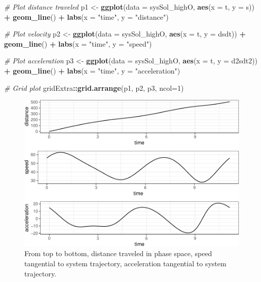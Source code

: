 \documentclass[12pt,twoside,openany]{reedthesis}
\newenvironment{Shaded}{\begin{snugshade}}{\end{snugshade}}
\newcommand{\KeywordTok}[1]{\textcolor[rgb]{0.13,0.29,0.53}{\textbf{#1}}}
\newcommand{\DataTypeTok}[1]{\textcolor[rgb]{0.13,0.29,0.53}{#1}}
\newcommand{\DecValTok}[1]{\textcolor[rgb]{0.00,0.00,0.81}{#1}}
\newcommand{\StringTok}[1]{\textcolor[rgb]{0.31,0.60,0.02}{#1}}
\newcommand{\CommentTok}[1]{\textcolor[rgb]{0.56,0.35,0.01}{\textit{#1}}}
\newcommand{\OperatorTok}[1]{\textcolor[rgb]{0.81,0.36,0.00}{\textbf{#1}}}
\newcommand{\NormalTok}[1]{#1}
\begin{document}
\begin{Shaded}
\begin{Highlighting}[]
\CommentTok{# Plot distance traveled}
\NormalTok{p1 <-}\StringTok{ }\KeywordTok{ggplot}\NormalTok{(}\DataTypeTok{data =}\NormalTok{ sysSol_highO, }\KeywordTok{aes}\NormalTok{(}\DataTypeTok{x =}\NormalTok{ t, }\DataTypeTok{y =}\NormalTok{ s)) }\OperatorTok{+}
\StringTok{  }\KeywordTok{geom_line}\NormalTok{() }\OperatorTok{+}
\StringTok{  }\KeywordTok{labs}\NormalTok{(}\DataTypeTok{x =} \StringTok{"time"}\NormalTok{, }\DataTypeTok{y =} \StringTok{"distance"}\NormalTok{)}

\CommentTok{# Plot velocity}
\NormalTok{p2 <-}\StringTok{ }\KeywordTok{ggplot}\NormalTok{(}\DataTypeTok{data =}\NormalTok{ sysSol_highO, }\KeywordTok{aes}\NormalTok{(}\DataTypeTok{x =}\NormalTok{ t, }\DataTypeTok{y =}\NormalTok{ dsdt)) }\OperatorTok{+}
\StringTok{  }\KeywordTok{geom_line}\NormalTok{() }\OperatorTok{+}
\StringTok{  }\KeywordTok{labs}\NormalTok{(}\DataTypeTok{x =} \StringTok{"time"}\NormalTok{, }\DataTypeTok{y =} \StringTok{"speed"}\NormalTok{)}

\CommentTok{# Plot acceleration}
\NormalTok{p3 <-}\StringTok{ }\KeywordTok{ggplot}\NormalTok{(}\DataTypeTok{data =}\NormalTok{ sysSol_highO, }\KeywordTok{aes}\NormalTok{(}\DataTypeTok{x =}\NormalTok{ t, }\DataTypeTok{y =}\NormalTok{ d2sdt2)) }\OperatorTok{+}
\StringTok{  }\KeywordTok{geom_line}\NormalTok{() }\OperatorTok{+}
\StringTok{  }\KeywordTok{labs}\NormalTok{(}\DataTypeTok{x =} \StringTok{"time"}\NormalTok{, }\DataTypeTok{y =} \StringTok{"acceleration"}\NormalTok{)}

\CommentTok{# Grid plot}
\NormalTok{gridExtra}\OperatorTok{::}\KeywordTok{grid.arrange}\NormalTok{(p1, p2, p3, }\DataTypeTok{ncol=}\DecValTok{1}\NormalTok{)}
\end{Highlighting}
\end{Shaded}
\begin{figure}
\centering
\includegraphics{_myDissertation_files/figure-latex/distSpeedAccel-1.pdf}
\caption{\label{fig:distSpeedAccel}From top to bottom, distance traveled in
phase space, speed tangential to system trajectory, acceleration
tangential to system trajectory.}
\end{figure}
\end{document}

